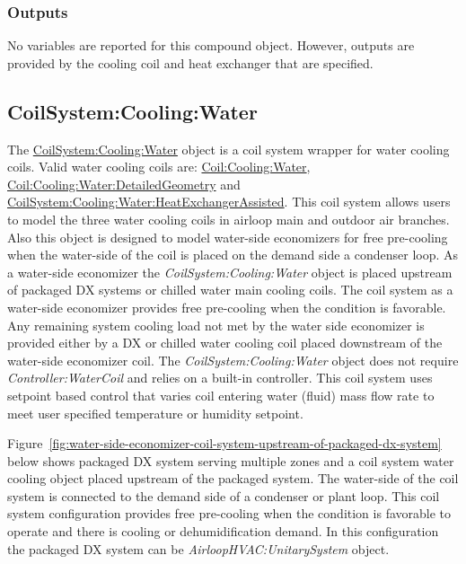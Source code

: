 \subsubsection{Outputs}\label{outputs-22}

No variables are reported for this compound object. However, outputs are provided by the cooling coil and heat exchanger that are specified.

\subsection{CoilSystem:Cooling:Water}\label{coilsystemcoolingwater}

The \hyperref[coilsystemcoolingwater]{CoilSystem:Cooling:Water} object is a coil system wrapper for water cooling coils. Valid water cooling coils are: \hyperref[coilcoolingwater]{Coil:Cooling:Water}, \hyperref[coilcoolingwaterdetailedgeometry]{Coil:Cooling:Water:DetailedGeometry} and \hyperref[coilsystemcoolingwaterheatexchangerassisted]{CoilSystem:Cooling:Water:HeatExchangerAssisted}. This coil system allows users to model the three water cooling coils in airloop main and outdoor air branches. Also this object is designed to model water-side economizers for free pre-cooling when the water-side of the coil is placed on the demand side a condenser loop. As a water-side economizer the \textit{CoilSystem:Cooling:Water} object is placed upstream of packaged DX systems or chilled water main cooling coils. The coil system as a water-side economizer provides free pre-cooling when the condition is favorable. Any remaining system cooling load not met by the water side economizer is provided either by a DX or chilled water cooling coil placed downstream of the water-side economizer coil. The \textit{CoilSystem:Cooling:Water} object does not require \textit{Controller:WaterCoil} and relies on a built-in controller. This coil system uses setpoint based control that varies coil entering water (fluid) mass flow rate to meet user specified temperature or humidity setpoint.\par

Figure~\ref{fig:water-side-economizer-coil-system-upstream-of-packaged-dx-system} below shows packaged DX system serving multiple zones and a coil system water cooling object placed upstream of the packaged system. The water-side of the coil system is connected to the demand side of a condenser or plant loop. This coil system configuration provides free pre-cooling when the condition is favorable to operate and there is cooling or dehumidification demand. In this configuration the packaged DX system can be \textit{AirloopHVAC:UnitarySystem} object.


